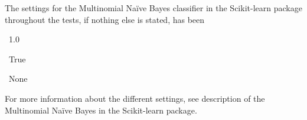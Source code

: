 The settings for the Multinomial Naïve Bayes classifier in the Scikit-learn package throughout the tests, if nothing else is stated, has been
\begin{description}
	\item[Alpha:] \ 1.0
	\item[Fit prior:]\ True
	\item[Class prior:] \ None
\end{description}
For more information about the different settings, see description of the Multinomial Naïve Bayes in the Scikit-learn package.